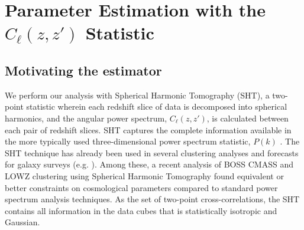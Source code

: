 \documentclass[fleqn,usenatbib]{mnras}
\begin{document}
\section{Parameter Estimation with the \texorpdfstring{$C_{\ell}(z,z')$}{Cl(z,z')} Statistic}
\label{sec:C_ell_Analysis}

\subsection{Motivating the estimator}
\label{subsec:motivating_estimator}

We perform our analysis with Spherical Harmonic Tomography (SHT), a two-point statistic wherein each redshift slice of data is decomposed into spherical harmonics, and the angular power spectrum, $C_{\ell}(z,z')$, is calculated between each pair of redshift slices. SHT captures the complete information available in the more typically used three-dimensional power spectrum statistic, $P(k)$ \citep{asorey2012recovering}. The SHT technique has already been used in several clustering analyses and forecasts for galaxy surveys (e.g. \cite{PhysRevLett.106.241301, 2013MNRAS.435.1857L, 2018MNRAS.476.1050B, loureiro2019cosmological,  2019JCAP...08..037X,
2019JCAP...12..028F, 2020JCAP...03..044N, 
2020JCAP...09..054V,
2021arXiv210700026T}). Among these, a recent analysis of BOSS CMASS and LOWZ clustering using Spherical Harmonic Tomography \citep{loureiro2019cosmological} found equivalent or better constraints on cosmological parameters compared to standard power spectrum analysis techniques. As the set of two-point cross-correlations, the SHT contains all information in the data cubes that is statistically isotropic and Gaussian.
\end{document}
